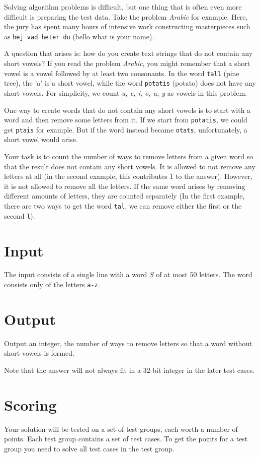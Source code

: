 \noindent
Solving algorithm problems is difficult, but one thing that is often even more difficult is preparing the test data. 
Take the problem \textit{Arabic} for example. Here, the jury has spent many hours of intensive work constructing masterpieces such as \texttt{hej vad heter du} (hello what is your name).

A question that arises is: how do you create text strings that do not contain any short vowels? 
If you read the problem \textit{Arabic}, you might remember that a short vowel is a vowel followed by at least two consonants. 
In the word \texttt{tall} (pine tree), the 'a' is a short vowel, while the word \texttt{potatis} (potato) does not have any short vowels. 
For simplicity, we count \textit{a, e, i, o, u, y} as vowels in this problem.

One way to create words that do not contain any short vowels is to start with a word and then remove some letters from it. If we start from \texttt{potatis}, we could get \texttt{ptais} for example. 
But if the word instead became \texttt{otats}, unfortunately, a short vowel would arise.

Your task is to count the number of ways to remove letters from a given word so that the result does not contain any short vowels. It is allowed to not remove any letters at all (in the second example, this contributes $1$ to the answer). 
However, it is not allowed to remove all the letters. If the same word arises by removing different amounts of letters, they are counted separately (In the first example, there are two ways to get the word \texttt{tal}, we can remove either the first or the second \texttt{l}).

\section*{Input}
The input consists of a single line with a word $S$ of at most 50 letters. The word consists only of the letters \texttt{a-z}.

\section*{Output}
Output an integer, the number of ways to remove letters so that a word without short vowels is formed.

Note that the answer will not always fit in a $32$-bit integer in the later test cases.

\section*{Scoring}
Your solution will be tested on a set of test groups, each worth a number of points. Each test group contains
a set of test cases. To get the points for a test group you need to solve all test cases in the test group.

